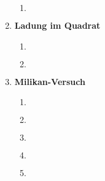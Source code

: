 \documentclass[11pt,letterpaper]{article}
\begin{document}
\begin{enumerate}
\begin{enumerate}
            \item
            \begin{align*}
            \end{align*}

        \end{enumerate}
    
    
    \item \textbf{Ladung im Quadrat}
        \begin{enumerate}
            \item
            \begin{align*}
            \end{align*}

            \item
            \begin{align*}
            \end{align*}

        \end{enumerate}

    
    \item \textbf{Milikan-Versuch}
        \begin{enumerate}
            \item
            \begin{align*}
            \end{align*}

            \item
            \begin{align*}
            \end{align*}

            \item
            \begin{align*}
            \end{align*}

            \item
            \begin{align*}
            \end{align*}

            \item
            \begin{align*}
            \end{align*}

        \end{enumerate}
\end{enumerate}
\end{document}

